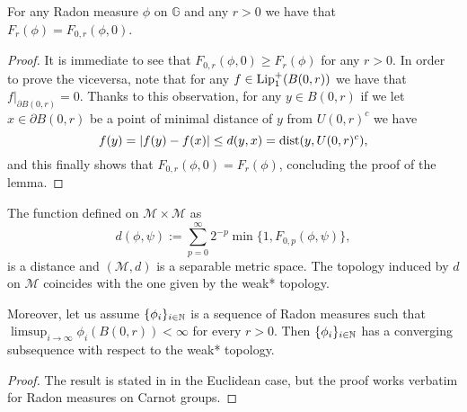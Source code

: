 \documentclass[10pt, a4paper,
oneside, headinclude,footinclude]{scrartcl}
\begin{document}
\begin{lemma}\label{dist:lemma}
For any Radon measure $\phi$ on $\mathbb{G}$ and any $r>0$ we have that  $F_r(\phi)=F_{0,r}(\phi,0)$.
\end{lemma}

\begin{proof}
It is immediate to see that $F_{0,r}(\phi,0)\geq F_r(\phi)$ for any $r>0$. In order to prove the viceversa, note that for any $f\in \operatorname*{Lip_1^+}(B(0,r))$ we have that $f\rvert_{\partial B(0,r)}=0$. Thanks to this observation, for any $y\in B(0,r)$ if we let $x\in \partial B(0,r)$ be a point of minimal distance of $y$ from $U(0,r)^c$ we have
$$f(y)=\lvert f(y)-f(x) \rvert\leq d(y,x)=\operatorname*{dist}(y,U(0,r)^c),$$
and this finally shows that $F_{0,r}(\phi,0)= F_r(\phi)$, concluding the proof of the lemma.
\end{proof}


\begin{proposizione}\label{prop1.12preiss}
The function defined on $\mathcal{M}\times\mathcal{M}$ as
$$d(\phi,\psi):=\sum_{p=0}^\infty 2^{-p}\min\{1,F_{0,p}(\phi,\psi)\},$$
is a distance and $(\mathcal{M},d)$ is a separable metric space. The topology induced by $d$ on $\mathcal{M}$ coincides with the one given by the weak* topology.

Moreover, let us assume $\{\phi_i\}_{i\in\mathbb{N}}$ is a sequence of Radon measures such that $\limsup_{i\to\infty}\phi_i(B(0,r))<\infty$ for every $r>0$. Then $\{\phi_i\}_{i\in\mathbb{N}}$ has a converging subsequence with respect to the weak* topology.
\end{proposizione}

\begin{proof}
The result is stated in \cite[Proposition 1.12]{Preiss1987GeometryDensities} in the Euclidean case, but the proof works verbatim for Radon measures on Carnot groups.
\end{proof}
\end{document}
